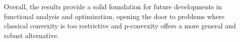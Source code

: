 \documentclass[10pt]{article}
\begin{document}
Overall, the results provide a solid foundation for future developments in functional analysis and optimization, opening the door to problems where classical convexity is too restrictive and p-convexity offers a more general and robust alternative.
%
\end{document}
